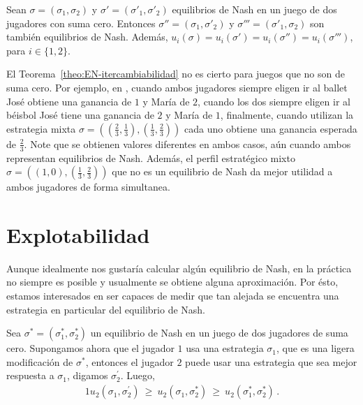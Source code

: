 \begin{theorem}
\label{theo:EN-itercambiabilidad}
Sean $\sigma = (\sigma_1, \sigma_2)$ y $\sigma' = (\sigma'_1, \sigma'_2)$ equilibrios de Nash en un juego de dos jugadores con suma cero. Entonces $\sigma'' = (\sigma_1, \sigma'_2)$ y $\sigma''' = (\sigma'_1, \sigma_2)$ son también equilibrios de Nash. Además, $u_i(\sigma) = u_i(\sigma') = u_i(\sigma'') = u_i(\sigma''')$, para $i \in \{1, 2\}$.
\end{theorem}

El Teorema~\ref{theo:EN-itercambiabilidad} no es cierto para juegos que no son de suma cero. Por ejemplo, en , cuando ambos jugadores siempre eligen ir al ballet José obtiene una ganancia de $1$ y María de $2$, cuando los dos siempre eligen ir al béisbol José tiene una ganancia de $2$ y María de $1$, finalmente, cuando utilizan la estrategia mixta $\sigma = \left(\left(\frac{2}{3}, \frac{1}{3}\right), \left(\frac{1}{3}, \frac{2}{3}\right)\right)$ cada uno obtiene una ganancia esperada de $\frac{2}{3}$. Note que se obtienen valores diferentes en ambos casos, aún cuando ambos representan equilibrios de Nash. Además, el perfil estratégico mixto $\sigma = \left((1, 0), \left(\frac{1}{3}, \frac{2}{3}\right)\right)$ que no es un equilibrio de Nash da mejor utilidad a ambos jugadores de forma simultanea.


\section{Explotabilidad}
\label{section:explotabilidad}

Aunque idealmente nos gustaría calcular algún equilibrio de Nash, en la práctica no siempre es posible y usualmente se obtiene alguna aproximación. Por ésto, estamos interesados en ser capaces de medir que tan alejada se encuentra una estrategia en particular del equilibrio de Nash.

Sea $\sigma^* = (\sigma^*_1, \sigma^*_2)$ un equilibrio de Nash en un juego de dos jugadores de suma cero. Supongamos ahora que el jugador $1$  usa una estrategia $\sigma_1$, que es una ligera modificación de $\sigma^*$, entonces el jugador $2$ puede usar una estrategia que sea mejor respuesta a $\sigma_1$, digamos $\sigma^{\prime}_2$. Luego,
\begin{alignat}{1}
u_2(\sigma_1, \sigma^{\prime}_2)\ \geq\ u_2(\sigma_1, \sigma^*_2)\ \geq\ u_2(\sigma^*_1, \sigma^*_2) \,.
\end{alignat}

